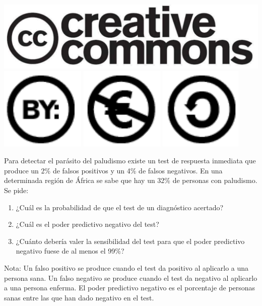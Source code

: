 \documentclass[aspectratio=149,10pt,xcolor=dvipsnames,t]{beamer}
\begin{document}
\begin{frame}[c]
\begin{center}
\biskip
\includegraphics[scale=0.07]{img/cc-logo}
\includegraphics[scale=0.2]{img/cc-by}
\includegraphics[scale=0.2]{img/cc-e}
\includegraphics[scale=0.2]{img/cc-c}
\end{center}
\end{frame}

\begin{frame}[c]
\large
Para detectar el parásito del paludismo existe un test de respuesta inmediata que produce un 2\% de falsos
positivos y un 4\% de falsos negativos. 
En una determinada región de África se sabe que hay un 32\% de personas con paludismo. 
Se pide:
\begin{enumerate}
\item ¿Cuál es la probabilidad de que el test de un diagnóstico acertado?
\item ¿Cuál es el poder predictivo negativo del test?
\item ¿Cuánto debería valer la sensibilidad del test para que el poder predictivo negativo fuese de al menos el 99\%?
\end{enumerate} 
Nota: Un falso positivo se produce cuando el test da positivo al aplicarlo a una persona sana. Un falso negativo se
produce cuando el test da negativo al aplicarlo a una persona enferma. El poder predictivo negativo es el porcentaje de
personas sanas entre las que han dado negativo en el test.
\end{frame}
\end{document}
